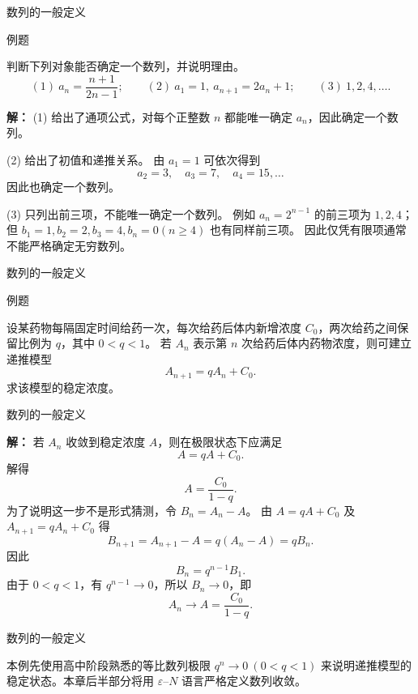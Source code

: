 \documentclass[aspectratio=169,10pt,fontset=fandol]{ctexbeamer}
\begin{document}
\begin{frame}[t,fragile]{数列的一般定义}
\footnotesize
\begin{block}{例题}
{\footnotesize
判断下列对象能否确定一个数列，并说明理由。
\[
(1)\ a_n=\frac{n+1}{2n-1};\qquad
(2)\ a_1=1,\ a_{n+1}=2a_n+1;\qquad
(3)\ 1,2,4,\ldots .
\]

}
\end{block}
\pause
{\footnotesize
\textbf{解：}
(1) 给出了通项公式，对每个正整数 $n$ 都能唯一确定 $a_n$，因此确定一个数列。

(2) 给出了初值和递推关系。 由 $a_1=1$ 可依次得到
\[
a_2=3,\quad a_3=7,\quad a_4=15,\ldots
\]
因此也确定一个数列。

(3) 只列出前三项，不能唯一确定一个数列。 例如 $a_n=2^{n-1}$ 的前三项为 $1,2,4$；但 $b_1=1,b_2=2,b_3=4,b_n=0(n\ge4)$ 也有同样前三项。 因此仅凭有限项通常不能严格确定无穷数列。

}
\end{frame}
\begin{frame}[t,fragile]{数列的一般定义}
\footnotesize
\begin{block}{例题}
{\footnotesize
设某药物每隔固定时间给药一次，每次给药后体内新增浓度 $C_0$，两次给药之间保留比例为 $q$，其中 $0<q<1$。 若 $A_n$ 表示第 $n$ 次给药后体内药物浓度，则可建立递推模型
\[
A_{n+1}=qA_n+C_0.
\]
求该模型的稳定浓度。

}
\end{block}
\end{frame}
\begin{frame}[t,fragile]{数列的一般定义}
\footnotesize
{\footnotesize
\textbf{解：}
若 $A_n$ 收敛到稳定浓度 $A$，则在极限状态下应满足
\[
A=qA+C_0.
\]
解得
\[
A=\frac{C_0}{1-q}.
\]
为了说明这一步不是形式猜测，令 $B_n=A_n-A$。 由 $A=qA+C_0$ 及 $A_{n+1}=qA_n+C_0$ 得
\[
B_{n+1}=A_{n+1}-A=q(A_n-A)=qB_n.
\]
因此
\[
B_n=q^{n-1}B_1.
\]
由于 $0<q<1$，有 $q^{n-1}\to0$，所以 $B_n\to0$，即
\[
A_n\to A=\frac{C_0}{1-q}.
\]

}
\end{frame}
\begin{frame}[t,fragile]{数列的一般定义}
\footnotesize
{\footnotesize
本例先使用高中阶段熟悉的等比数列极限 $q^n\to0\ (0<q<1)$ 来说明递推模型的稳定状态。本章后半部分将用 $\varepsilon$--$N$ 语言严格定义数列收敛。

}
\end{frame}
\end{document}
